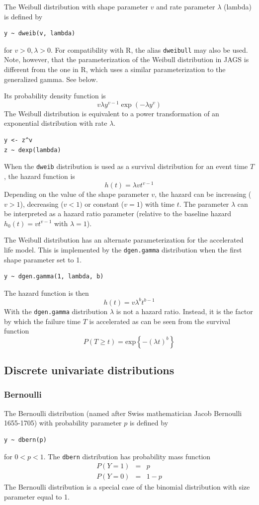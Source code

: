 \documentclass[11pt, a4paper, titlepage]{report}
\newcommand{\R}{\textsf{R}}
\begin{document}
The Weibull distribution with shape parameter $v$ and rate parameter
$\lambda$ (lambda) is defined by
\begin{verbatim}
y ~ dweib(v, lambda)
\end{verbatim}
for $v > 0, \lambda > 0$. For compatibility with \R, the alias
\texttt{dweibull} may also be used. Note, however, that the
parameterization of the Weibull distribution in JAGS is different from
the one in \R, which uses a similar parameterization to the
generalized gamma. See below.

Its probability density function is
\[
v  \lambda  y^{v - 1} \exp (- \lambda y^v)
\]
The Weibull distribution is equivalent to a power transformation of
an exponential distribution with rate $\lambda$.
\begin{verbatim}
y <- z^v
z ~ dexp(lambda)
\end{verbatim}

When the \texttt{dweib} distribution is used as a survival
distribution for an event time $T$, the hazard function is
\[
h(t) = \lambda v t^{v-1}
\]
Depending on the value of the shape parameter $v$, the hazard can be
increasing ($v > 1$), decreasing ($v < 1)$ or constant ($v=1$) with
time $t$. The parameter $\lambda$ can be interpreted as a hazard ratio
parameter (relative to the baseline hazard $h_0(t) = v t^{v-1}$ with
$\lambda=1$).

The Weibull distribution has an alternate parameterization for the
accelerated life model. This is implemented by the \texttt{dgen.gamma}
distribution when the first shape parameter set to 1.
\begin{verbatim}
y ~ dgen.gamma(1, lambda, b)
\end{verbatim}
The hazard function is then
\[
h(t) = v \lambda^b t^{b-1}
\]
With the \texttt{dgen.gamma} distribution $\lambda$ is not a hazard
ratio. Instead, it is the factor by which the failure time $T$ is
accelerated as can be seen from the survival function
\[
P(T \geq t) = \mbox{exp}\left\{ - \left(\lambda t \right)^b \right\}
\]

\subsection{Discrete univariate distributions}

\subsubsection{Bernoulli}

The Bernoulli distribution (named after Swiss mathematician Jacob
Bernoulli 1655-1705) with probability parameter $p$ is defined by
\begin{verbatim}
y ~ dbern(p)
\end{verbatim}
for $0 < p < 1$. The \texttt{dbern} distribution has probability mass function
\begin{eqnarray*}
  P(Y=1) & = & p \\
  P(Y=0) & = & 1 - p
\end{eqnarray*}
The Bernoulli distribution is a special case of the binomial distribution
with size parameter equal to 1.
\end{document}

